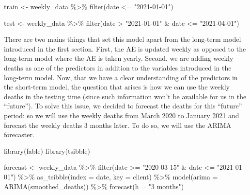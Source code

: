 \documentclass[
]{article}
\newenvironment{Shaded}{\begin{snugshade}}{\end{snugshade}}
\newcommand{\AttributeTok}[1]{\textcolor[rgb]{0.77,0.63,0.00}{#1}}
\newcommand{\FunctionTok}[1]{\textcolor[rgb]{0.00,0.00,0.00}{#1}}
\newcommand{\NormalTok}[1]{#1}
\newcommand{\OtherTok}[1]{\textcolor[rgb]{0.56,0.35,0.01}{#1}}
\newcommand{\SpecialCharTok}[1]{\textcolor[rgb]{0.00,0.00,0.00}{#1}}
\newcommand{\StringTok}[1]{\textcolor[rgb]{0.31,0.60,0.02}{#1}}
\begin{document}
\begin{Shaded}
\begin{Highlighting}[]
\NormalTok{train }\OtherTok{\textless{}{-}}
\NormalTok{  weekly\_data }\SpecialCharTok{\%\textgreater{}\%}
  \FunctionTok{filter}\NormalTok{(date }\SpecialCharTok{\textless{}=} \StringTok{"2021{-}01{-}01"}\NormalTok{)}

\NormalTok{test }\OtherTok{\textless{}{-}}
\NormalTok{  weekly\_data }\SpecialCharTok{\%\textgreater{}\%}
  \FunctionTok{filter}\NormalTok{(date }\SpecialCharTok{\textgreater{}} \StringTok{"2021{-}01{-}01"} \SpecialCharTok{\&}\NormalTok{ date }\SpecialCharTok{\textless{}=} \StringTok{"2021{-}04{-}01"}\NormalTok{)}
\end{Highlighting}
\end{Shaded}

There are two mains things that set this model apart from the long-term
model introduced in the first section. First, the AE is updated weekly
as opposed to the long-term model where the AE is taken yearly. Second,
we are adding weekly deaths as one of the predictors in addition to the
variables introduced in the long-term model. Now, that we have a clear
understanding of the predictors in the short-term model, the question
that arises is how we can use the weekly deaths in the testing time
(since such information won't be available for us in the ``future''). To
solve this issue, we decided to forecast the deaths for this ``future''
period: so we will use the weekly deaths from March 2020 to January 2021
and forecast the weekly deaths 3 months later. To do so, we will use the
ARIMA forecaster.

\begin{Shaded}
\begin{Highlighting}[]
\FunctionTok{library}\NormalTok{(fable)}
\FunctionTok{library}\NormalTok{(tsibble)}
\end{Highlighting}
\end{Shaded}

\begin{Shaded}
\begin{Highlighting}[]
\NormalTok{forecast }\OtherTok{\textless{}{-}}
\NormalTok{  weekly\_data }\SpecialCharTok{\%\textgreater{}\%}
  \FunctionTok{filter}\NormalTok{(date }\SpecialCharTok{\textgreater{}=} \StringTok{"2020{-}03{-}15"} \SpecialCharTok{\&}\NormalTok{ date }\SpecialCharTok{\textless{}=} \StringTok{"2021{-}01{-}01"}\NormalTok{) }\SpecialCharTok{\%\textgreater{}\%}
  \FunctionTok{as\_tsibble}\NormalTok{(}\AttributeTok{index =}\NormalTok{ date, }\AttributeTok{key =}\NormalTok{ client) }\SpecialCharTok{\%\textgreater{}\%}
  \FunctionTok{model}\NormalTok{(}\AttributeTok{arima =} \FunctionTok{ARIMA}\NormalTok{(smoothed\_deaths)) }\SpecialCharTok{\%\textgreater{}\%}
  \FunctionTok{forecast}\NormalTok{(}\AttributeTok{h =} \StringTok{"3 months"}\NormalTok{)}
\end{Highlighting}
\end{Shaded}
\end{document}
